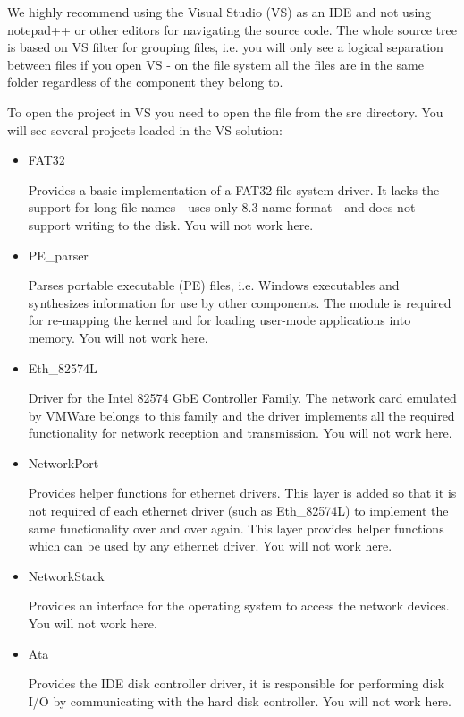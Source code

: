 We highly recommend using the Visual Studio (VS) as an IDE and not using notepad++ or other editors
for navigating the source code. The whole source tree is based on VS filter for grouping files, i.e.
you will only see a logical separation between files if you open VS - on the file system all the
files are in the same folder regardless of the component they belong to.

To open the project in VS you need to open the  file from the src directory. You
will see several projects loaded in the VS solution:
\begin{itemize}
	\item FAT32

	Provides a basic implementation of a FAT32 file system driver. It lacks the support for long
file names - uses only 8.3 name format - and does not support writing to the disk. You will not work
here.

	\item PE\_parser

	Parses portable executable (PE) files, i.e. Windows executables and synthesizes
information for use by other components. The module is required for re-mapping the kernel and for
loading user-mode applications into memory. You will not work here.

	\item Eth\_82574L

	Driver for the Intel 82574 GbE Controller Family. The network card emulated by VMWare belongs to
this family and the driver implements all the required functionality for network reception and
transmission. You will not work here.

	\item NetworkPort

	Provides helper functions for ethernet drivers. This layer is added so that it is not required
of each ethernet driver (such as Eth\_82574L) to implement the same functionality over and over
again. This layer provides helper functions which can be used by any ethernet driver. You will not
work here.

	\item NetworkStack

	Provides an interface for the operating system to access the network devices. You will not work
here.

	\item Ata

	Provides the IDE disk controller driver, it is responsible for performing disk I/O by
communicating with the hard disk controller. You will not work here.


\end{itemize}
